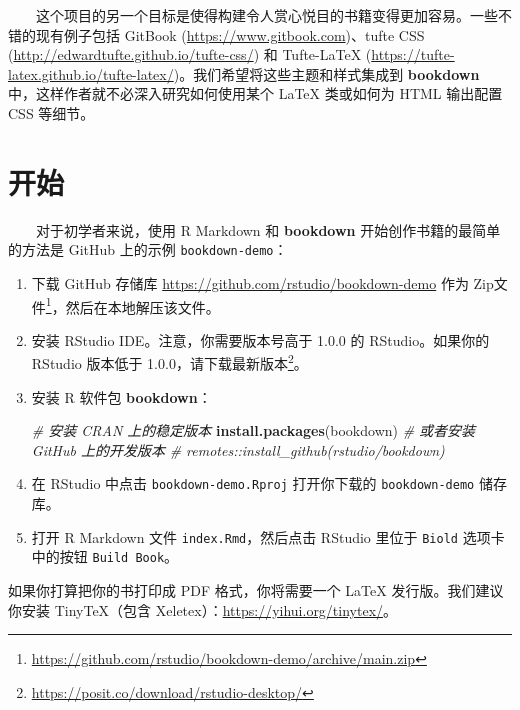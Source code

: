 \documentclass[
  12pt,
]{krantz}
\makeatletter
\newenvironment{Shaded}{\begin{snugshade}}{\end{snugshade}}
\newcommand{\CommentTok}[1]{\textcolor[rgb]{0.56,0.35,0.01}{\textit{#1}}}
\newcommand{\FunctionTok}[1]{\textcolor[rgb]{0.13,0.29,0.53}{\textbf{#1}}}
\newcommand{\NormalTok}[1]{#1}
\newcommand{\StringTok}[1]{\textcolor[rgb]{0.31,0.60,0.02}{#1}}
\renewcommand{\href}[2]{#2\footnote{\url{#1}}}
\newenvironment{kframe}{%
\medskip{}
\setlength{\fboxsep}{.8em}
 \def\at@end@of@kframe{}%
 \ifinner\ifhmode%
  \def\at@end@of@kframe{\end{minipage}}%
  \begin{minipage}{\columnwidth}%
 \fi\fi%
 \def\FrameCommand##1{\hskip\@totalleftmargin \hskip-\fboxsep
 \colorbox{shadecolor}{##1}\hskip-\fboxsep
     \hskip-\linewidth \hskip-\@totalleftmargin \hskip\columnwidth}%
 \MakeFramed {\advance\hsize-\width
   \@totalleftmargin\z@ \linewidth\hsize
   \@setminipage}}%
 {\par\unskip\endMakeFramed%
 \at@end@of@kframe}
\newenvironment{rmdblock}[1]
  {
  \begin{itemize}
  \renewcommand{\labelitemi}{
    \raisebox{-.7\height}[0pt][0pt]{
      {\setkeys{Gin}{width=3em,keepaspectratio}\texttt{[image: images/\#1]}}
    }
  }
  \setlength{\fboxsep}{1em}
  \begin{kframe}
  \item
  }
  {
  \end{kframe}
  \end{itemize}
  }
\newenvironment{rmdnote}
  {\begin{rmdblock}{note}}
  {\end{rmdblock}}
\theoremstyle{definition}
\theoremstyle{definition}
\theoremstyle{definition}
\theoremstyle{definition}
\theoremstyle{remark}
\makeatother
\begin{document}
  这个项目的另一个目标是使得构建令人赏心悦目的书籍变得更加容易。一些不错的现有例子包括 GitBook (\url{https://www.gitbook.com})、tufte CSS (\url{http://edwardtufte.github.io/tufte-css/}) 和 Tufte-LaTeX (\url{https://tufte-latex.github.io/tufte-latex/})。我们希望将这些主题和样式集成到 \textbf{bookdown} 中，这样作者就不必深入研究如何使用某个 LaTeX 类或如何为 HTML 输出配置 CSS 等细节。

\hypertarget{ux5f00ux59cb}{%
\section{开始}\label{ux5f00ux59cb}}

  对于初学者来说，使用 R Markdown 和 \textbf{bookdown} 开始创作书籍的最简单的方法是 GitHub 上的示例 \texttt{bookdown-demo}：

\begin{enumerate}
\def\labelenumi{\arabic{enumi}.}
\item
  下载 GitHub 存储库 \url{https://github.com/rstudio/bookdown-demo} 作为 \href{https://github.com/rstudio/bookdown-demo/archive/main.zip}{Zip文件}，然后在本地解压该文件。
\item
  安装 RStudio IDE。注意，你需要版本号高于 1.0.0 的 RStudio。如果你的 RStudio 版本低于 1.0.0，请\href{https://posit.co/download/rstudio-desktop/}{下载最新版本}。
\item
  安装 R 软件包 \textbf{bookdown}：

\begin{Shaded}
\begin{Highlighting}[]
\CommentTok{\# 安装 CRAN 上的稳定版本}
\FunctionTok{install.packages}\NormalTok{(}\StringTok{\textquotesingle{}bookdown\textquotesingle{}}\NormalTok{)}
\CommentTok{\# 或者安装 GitHub 上的开发版本}
\CommentTok{\# remotes::install\_github(\textquotesingle{}rstudio/bookdown\textquotesingle{})}
\end{Highlighting}
\end{Shaded}
\item
  在 RStudio 中点击 \texttt{bookdown-demo.Rproj} 打开你下载的 \texttt{bookdown-demo} 储存库。
\item
  打开 R Markdown 文件 \texttt{index.Rmd}，然后点击 RStudio 里位于 \texttt{Biold} 选项卡中的按钮 \texttt{Build\ Book}。
\end{enumerate}

\begin{rmdnote}
如果你打算把你的书打印成 PDF 格式，你将需要一个 LaTeX 发行版。我们建议你安装 TinyTeX（包含 Xeletex）：\url{https://yihui.org/tinytex/}。
\end{rmdnote}
\end{document}
